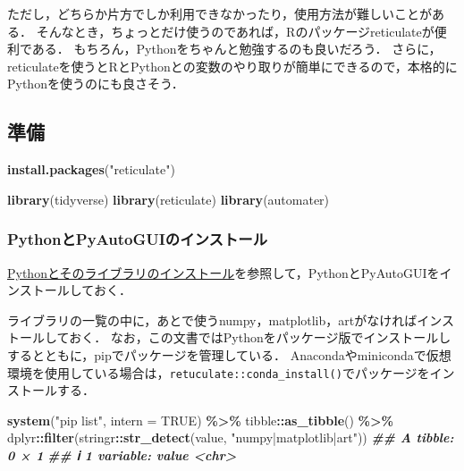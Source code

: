 \documentclass[
]{article}
\newenvironment{Shaded}{\begin{snugshade}}{\end{snugshade}}
\newcommand{\AttributeTok}[1]{\textcolor[rgb]{0.13,0.29,0.53}{#1}}
\newcommand{\ConstantTok}[1]{\textcolor[rgb]{0.56,0.35,0.01}{#1}}
\newcommand{\DocumentationTok}[1]{\textcolor[rgb]{0.56,0.35,0.01}{\textbf{\textit{#1}}}}
\newcommand{\FunctionTok}[1]{\textcolor[rgb]{0.13,0.29,0.53}{\textbf{#1}}}
\newcommand{\NormalTok}[1]{#1}
\newcommand{\SpecialCharTok}[1]{\textcolor[rgb]{0.81,0.36,0.00}{\textbf{#1}}}
\newcommand{\StringTok}[1]{\textcolor[rgb]{0.31,0.60,0.02}{#1}}
\begin{document}
ただし，どちらか片方でしか利用できなかったり，使用方法が難しいことがある．
そんなとき，ちょっとだけ使うのであれば，Rのパッケージreticulateが便利である．
もちろん，Pythonをちゃんと勉強するのも良いだろう．
さらに，reticulateを使うとRとPythonとの変数のやり取りが簡単にできるので，本格的にPythonを使うのにも良さそう．

\hypertarget{ux6e96ux5099-7}{%
\subsection{準備}\label{ux6e96ux5099-7}}

\begin{Shaded}
\begin{Highlighting}[]
\FunctionTok{install.packages}\NormalTok{(}\StringTok{"reticulate"}\NormalTok{)}
\end{Highlighting}
\end{Shaded}

\begin{Shaded}
\begin{Highlighting}[]
\FunctionTok{library}\NormalTok{(tidyverse)}
\FunctionTok{library}\NormalTok{(reticulate)}
\FunctionTok{library}\NormalTok{(automater)}
\end{Highlighting}
\end{Shaded}

\hypertarget{pythonux3068pyautoguiux306eux30a4ux30f3ux30b9ux30c8ux30fcux30eb}{%
\subsubsection{PythonとPyAutoGUIのインストール}\label{pythonux3068pyautoguiux306eux30a4ux30f3ux30b9ux30c8ux30fcux30eb}}

\protect\hyperlink{install_python}{Pythonとそのライブラリのインストール}を参照して，PythonとPyAutoGUIをインストールしておく．

ライブラリの一覧の中に，あとで使うnumpy，matplotlib，artがなければインストールしておく．
なお，この文書ではPythonをパッケージ版でインストールしするとともに，pipでパッケージを管理している．
Anacondaやminicondaで仮想環境を使用している場合は，\texttt{retuculate::conda\_install()}でパッケージをインストールする．

\begin{Shaded}
\begin{Highlighting}[]
\FunctionTok{system}\NormalTok{(}\StringTok{"pip list"}\NormalTok{, }\AttributeTok{intern =} \ConstantTok{TRUE}\NormalTok{) }\SpecialCharTok{\%\textgreater{}\%}
\NormalTok{  tibble}\SpecialCharTok{::}\FunctionTok{as\_tibble}\NormalTok{() }\SpecialCharTok{\%\textgreater{}\%}
\NormalTok{  dplyr}\SpecialCharTok{::}\FunctionTok{filter}\NormalTok{(stringr}\SpecialCharTok{::}\FunctionTok{str\_detect}\NormalTok{(value, }\StringTok{"numpy|matplotlib|art"}\NormalTok{))}
\DocumentationTok{\#\# A tibble: 0 × 1}
\DocumentationTok{\#\# ℹ 1 variable: value \textless{}chr\textgreater{}}
\end{Highlighting}
\end{Shaded}
\end{document}
